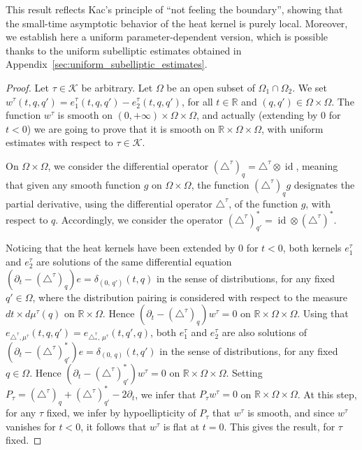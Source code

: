 \documentclass[AHL,Unicode,published]{cedram}
\newcommand*\R{\mathbb{R}}
\newcommand{\calK}{\mathcal{K}}
\DeclareMathOperator{\id}{id}
\begin{document}
This result reflects Kac's principle of ``not feeling the boundary'', showing that the small-time asymptotic behavior of the heat kernel is purely local. Moreover, we establish here a uniform parameter-dependent version, which is possible thanks to the uniform subelliptic estimates obtained in Appendix~\ref{sec:uniform_subelliptic_estimates}.


\begin{proof}
Let $\tau\in\calK$ be arbitrary. Let $\Omega$ be an open subset of $\Omega_1\cap\Omega_2$. We set $w^\tau(t,q,q')=e^\tau_1(t,q,q')-e^\tau_2(t,q,q')$, for all $t\in\R$ and $(q,q')\in\Omega\times\Omega$. The function $w^\tau$ is smooth on $(0,+\infty)\times\Omega\times\Omega$, and actually (extending by $0$ for $t<0$) we are going to prove that it is smooth on $\R\times\Omega\times\Omega$, with uniform estimates with respect to $\tau\in\calK$.

On $\Omega\times\Omega$, we consider the differential operator $(\triangle^\tau)_q = \triangle^\tau\otimes\id$, meaning that given any smooth function $g$ on $\Omega\times\Omega$, the function $(\triangle^\tau)_q g$ designates the partial derivative, using the differential operator $\triangle^\tau$, of the function $g$, with respect to $q$. Accordingly, we consider the operator $(\triangle^\tau)_{q'}^* = \id\otimes (\triangle^\tau)^*$.

Noticing that the heat kernels have been extended by $0$ for $t<0$, both kernels $e^\tau_1$ and $e^\tau_2$ are solutions of the same differential equation $(\partial_t - (\triangle^\tau)_q)e = \delta_{(0,\,q')}(t,q)$ in the sense of distributions, for any fixed $q'\in\Omega$, where the distribution pairing is considered with respect to the measure $dt\times d\mu^\tau(q)$ on $\R\times\Omega$. Hence $(\partial_t-(\triangle^\tau)_q)w^\tau=0$ on $\R\times\Omega\times\Omega$. Using that $e_{\triangle^\tau,\mu^\tau}(t,q,q') = e_{\triangle^\tau_*,\,\mu^\tau}(t,q',q)$, both $e^\tau_1$ and $e^\tau_2$ are also solutions of $(\partial_t - (\triangle^\tau)_{q'}^*)e = \delta_{(0,\,q)}(t,q')$ in the sense of distributions, for any fixed $q\in\Omega$. Hence $(\partial_t-(\triangle^\tau)_{q'}^*)w^\tau=0$ on $\R\times\Omega\times\Omega$. Setting $P_\tau = (\triangle^\tau)_q + (\triangle^\tau)_{q'}^* - 2 \partial_t$, we infer that $P_\tau w^\tau=0$ on $\R\times\Omega\times\Omega$. At this step, for any $\tau$ fixed, we infer by hypoellipticity of $P_\tau$ that $w^\tau$ is smooth, and since $w^\tau$ vanishes for $t<0$, it follows that $w^\tau$ is flat at $t=0$. This gives the result, for $\tau$ fixed.


\end{proof}
\end{document}
